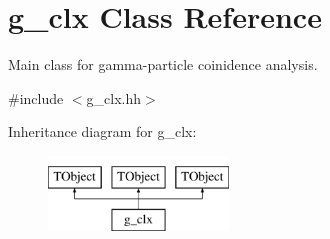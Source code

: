 \hypertarget{classg__clx}{\section{g\-\_\-clx Class Reference}
\label{classg__clx}
}


Main class for gamma-\/particle coinidence analysis.  




{\ttfamily \#include $<$g\-\_\-clx.\-hh$>$}

Inheritance diagram for g\-\_\-clx\-:\begin{figure}[H]
\begin{center}
\leavevmode
\includegraphics[height=2.000000cm]{classg__clx}
\end{center}
\end{figure}
